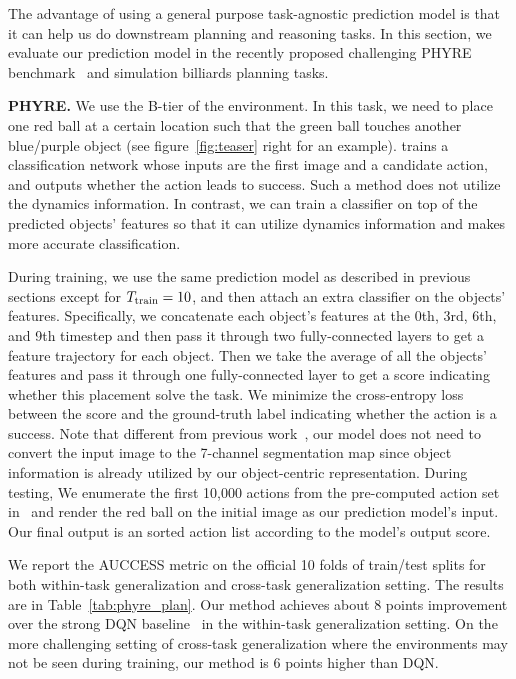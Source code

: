 \documentclass{article} \usepackage{iclr2021_conference,times}
\newcommand{\numoutput}{T}
\begin{document}
The advantage of using a general purpose task-agnostic prediction model is that it can help us do downstream planning and reasoning tasks. In this section, we evaluate our prediction model in the recently proposed challenging PHYRE benchmark~\citep{bakhtin2019phyre} and simulation billiards planning tasks.

\textbf{PHYRE.} We use the B-tier of the environment. In this task, we need to place one red ball at a certain location such that the green ball touches another blue/purple object (see figure~\ref{fig:teaser} right for an example). \citet{bakhtin2019phyre} trains a classification network whose inputs are the first image and a candidate action, and outputs whether the action leads to success. Such a method does not utilize the dynamics information. In contrast, we can train a classifier on top of the predicted objects' features so that it can utilize dynamics information and makes more accurate classification.

During training, we use the same prediction model as described in previous sections except for $\numoutput_{\rm train} = 10$, and then attach an extra classifier on the objects' features. Specifically, we concatenate each object's features at the 0th, 3rd, 6th, and 9th timestep and then pass it through two fully-connected layers to get a feature trajectory for each object. Then we take the average of all the objects' features and pass it through one fully-connected layer to get a score indicating whether this placement solve the task. We minimize the cross-entropy loss between the score and the ground-truth label indicating whether the action is a success. Note that different from previous work~\citep{bakhtin2019phyre,girdhar2020forward}, our model does not need to convert the input image to the 7-channel segmentation map since object information is already utilized by our object-centric representation. During testing, We enumerate the first 10,000 actions from the pre-computed action set in~\citet{bakhtin2019phyre} and render the red ball on the initial image as our prediction model's input. Our final output is an sorted action list according to the model's output score.

We report the AUCCESS metric on the official 10 folds of train/test splits for both within-task generalization and cross-task generalization setting. The results are in Table~\ref{tab:phyre_plan}. Our method achieves about 8 points improvement over the strong DQN baseline~\citep{bakhtin2019phyre} in the within-task generalization setting. On the more challenging setting of cross-task generalization where the environments may not be seen during training, our method is 6 points higher than DQN.
\end{document}
